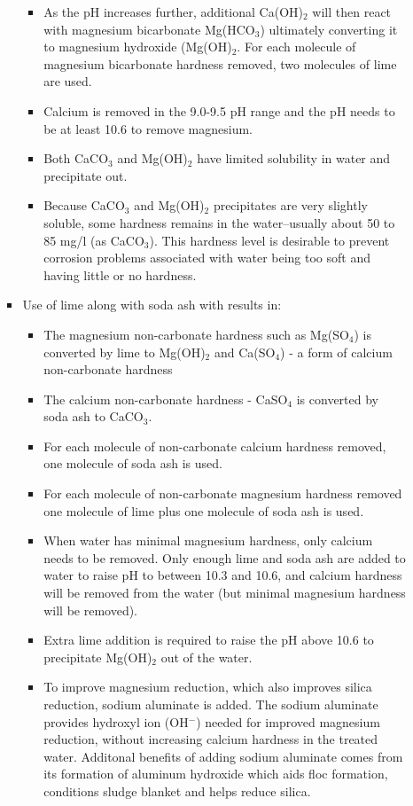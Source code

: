 \begin{itemize}
\begin{enumerate}
\begin{itemize}
\begin{itemize}
\item As the pH increases further, additional Ca(OH)$_2$ will then react with magnesium bicarbonate Mg(HCO$_3$) ultimately converting it to magnesium hydroxide (Mg(OH)$_2$.  For each molecule of magnesium bicarbonate hardness removed, two molecules of lime are used.
\item Calcium is removed in the 9.0-9.5 pH range and the pH needs to be at least 10.6 to remove magnesium.
\item Both CaCO$_3$ and Mg(OH)$_2$ have limited solubility in water and precipitate out.
\item Because CaCO$_3$ and Mg(OH)$_2$ precipitates are very slightly soluble, some hardness remains in the water--usually about 50 to 85 mg/l (as CaCO$_3$). This hardness level is desirable to prevent corrosion problems associated with water being too soft and having little or no hardness.
\end{itemize}
\item Use of lime along with soda ash  with results in:
\begin{itemize}
\item The magnesium non-carbonate hardness such as Mg(SO$_4$) is converted by lime to Mg(OH)$_2$ and Ca(SO$_4$) - a form of calcium non-carbonate hardness 
\item The calcium non-carbonate hardness - CaSO$_4$ is converted by soda ash to CaCO$_3$.  
\item For each molecule of non-carbonate calcium hardness removed, one molecule of soda ash is used.
\item For each molecule of non-carbonate magnesium hardness removed one molecule of lime plus one molecule of soda ash is used.
\item When water has minimal magnesium hardness, only calcium needs to be removed. Only enough lime and soda ash are added to water to raise pH to between 10.3 and 10.6, and calcium hardness will be removed from the water (but minimal magnesium hardness will be removed).
\item Extra lime addition is required to raise the pH above 10.6 to precipitate Mg(OH)$_2$ out of the water.
\item To improve magnesium reduction, which also improves silica reduction, sodium aluminate is added.  The sodium aluminate provides hydroxyl ion (OH$^-$) needed for improved magnesium reduction, without increasing calcium hardness in the treated water.  Additonal benefits of adding sodium aluminate comes from its formation of aluminum hydroxide which aids floc formation, conditions sludge blanket and helps reduce silica.

\end{itemize}
\end{itemize}
\end{enumerate}
\end{itemize}
